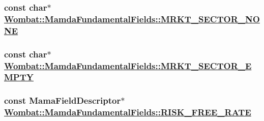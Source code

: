 \hypertarget{classWombat_1_1MamdaFundamentalFields_78a5b6970d4870642faa9cb5554c20e2}{
\subsubsection[MRKT\_\-SECTOR\_\-NONE]{\setlength{\rightskip}{0pt plus 5cm}const char$\ast$ \hyperlink{classWombat_1_1MamdaFundamentalFields_78a5b6970d4870642faa9cb5554c20e2}{Wombat::Mamda\-Fundamental\-Fields::MRKT\_\-SECTOR\_\-NONE}}}
\label{classWombat_1_1MamdaFundamentalFields_78a5b6970d4870642faa9cb5554c20e2}


\hypertarget{classWombat_1_1MamdaFundamentalFields_9a10c472fddc29714e5498ce3ec4df71}{
\subsubsection[MRKT\_\-SECTOR\_\-EMPTY]{\setlength{\rightskip}{0pt plus 5cm}const char$\ast$ \hyperlink{classWombat_1_1MamdaFundamentalFields_9a10c472fddc29714e5498ce3ec4df71}{Wombat::Mamda\-Fundamental\-Fields::MRKT\_\-SECTOR\_\-EMPTY}}}
\label{classWombat_1_1MamdaFundamentalFields_9a10c472fddc29714e5498ce3ec4df71}


\hypertarget{classWombat_1_1MamdaFundamentalFields_f96a9a7c8d09ac71d15e2ce8dd381536}{
\subsubsection[RISK\_\-FREE\_\-RATE]{\setlength{\rightskip}{0pt plus 5cm}const Mama\-Field\-Descriptor$\ast$ \hyperlink{classWombat_1_1MamdaFundamentalFields_f96a9a7c8d09ac71d15e2ce8dd381536}{Wombat::Mamda\-Fundamental\-Fields::RISK\_\-FREE\_\-RATE}}}
\label{classWombat_1_1MamdaFundamentalFields_f96a9a7c8d09ac71d15e2ce8dd381536}


